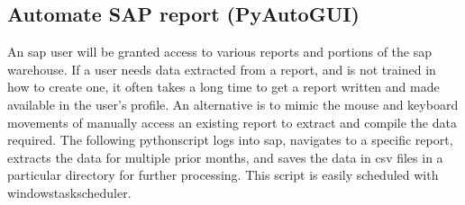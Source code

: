 \documentclass[10pt, letterpaper, twoside]{article}
\begin{document}
\subsection{Automate SAP report (PyAutoGUI)}\label{sec:automate_sap_report}
An \Gls{sap} user will be granted access to various reports and portions of the \Gls{sap} warehouse. If a user needs data extracted from a report, and is not trained in how to create one, it often takes a long time to get a report written and made available in the user's profile. An alternative is to mimic the mouse and keyboard movements of manually access an existing report to extract and compile the data required. The following \Gls{pythonscript} logs into \Gls{sap}, navigates to a specific report, extracts the data for multiple prior months, and saves the data in csv files in a particular directory for further processing. This script is easily scheduled with \Gls{windowstaskscheduler}.
\end{document}
